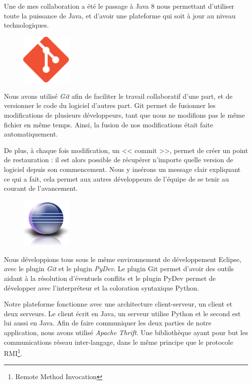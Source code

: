 Une de mes collaboration a été le passage à Java 8 nous permettant d'utiliser toute la puissance de Java, et d'avoir une plateforme qui soit
à jour au niveau technologiques.

\begin{figure}
	\includegraphics[width=2.5cm]{contents/images/logoGit.png}
\end{figure}
Nous avons utilisé \textit{Git} afin de faciliter le travail collaboratif d'une part, et de versionner le code du logiciel d'autres part. Git permet de fusionner les
modifications de plusieurs développeurs, tant que nous ne modifions pas le même fichier en même temps. Ainsi, la fusion de nos modifications était faite automatiquement. 

De plus, à chaque fois modification, un << commit >>, permet de créer un point de restauration : il est alors possible de
récupérer n'importe quelle version de logiciel depuis son commencement. Nous y insérons un message clair expliquant ce qui a fait, cela permet aux autres développeurs de l'équipe de se tenir au courant de l'avancement.

\begin{figure}
	\includegraphics[width=2.5cm]{contents/images/logoEclipse.png}
\end{figure}
Nous développions tous sous le même environnement de développement Eclipse, avec le plugin \textit{Git} et le plugin \textit{PyDev}. Le
plugin Git permet d'avoir des outils aidant à la résolution d'éventuels conflits et le plugin PyDev permet de développer avec l'interpréteur
et la coloration syntaxique Python. 

Notre plateforme fonctionne avec une architecture client-serveur, un client et deux serveurs. Le client écrit en Java, un serveur utilise
Python et le second est lui aussi en Java. Afin de faire communiquer les deux parties de notre application, nous avons utilisé \textit{Apache Thrift}. Une bibliothèque ayant pour but les communications réseau inter-langage, dans le même principe que le protocole RMI\footnote{Remote Method Invocation}.

